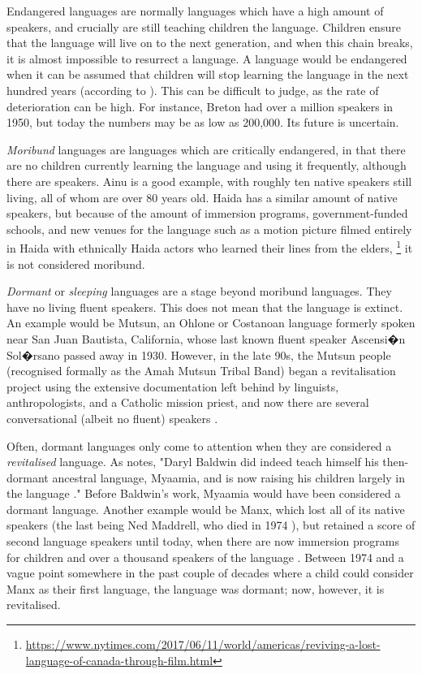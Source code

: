 Endangered languages are normally languages which have a high amount of speakers, and crucially are still teaching children the language. Children ensure that the language will live on to the next generation, and when this chain breaks, it is almost impossible to resurrect a language. A language would be endangered when it can be assumed that children will stop learning the language in the next hundred years (according to \citet{krauss92}). This can be difficult to judge, as the rate of deterioration can be high. For instance, Breton had over a million speakers in 1950, but today the numbers may be as low as 200,000. Its future is uncertain.

 \emph{Moribund} languages are languages which are critically endangered, in that there are no children currently learning the language and using it frequently, although there are speakers. Ainu is a good example, with roughly ten native speakers still living, all of whom are over 80 years old. %
Haida has a similar amount of native speakers, but because of the amount of immersion programs, government-funded schools, and new venues for the language such as a motion picture filmed entirely in Haida with ethnically Haida actors who learned their lines from the elders, \footnote{\href{https://www.nytimes.com/2017/06/11/world/americas/reviving-a-lost-language-of-canada-through-film.html}{https://www.nytimes.com/2017/06/11/world/americas/reviving-a-lost-language-of-canada-through-film.html}} it is not considered moribund.

 \emph{Dormant} or {\it sleeping} languages are a stage beyond moribund languages. They have no living fluent speakers. This does not mean that the language is extinct. An example would be Mutsun, an Ohlone or Costanoan language formerly spoken near San Juan Bautista, California, whose last known fluent speaker Ascensi�n Sol�rsano passed away in 1930. However, in the late 90s, the Mutsun people (recognised formally as the Amah Mutsun Tribal Band)  began a revitalisation project using the extensive documentation left behind by linguists, anthropologists, and a Catholic mission priest, and now there are several conversational (albeit no fluent) speakers \citep{warner2007ethics}.

Often, dormant languages only come to attention when they are considered a {\it revitalised} language. As \citet{warner2007ethics} notes, "Daryl Baldwin did indeed teach himself his then-dormant ancestral language, Myaamia, and is now raising his children largely in the language \citep{hinton2001sleeping, leonard2004acquisition}." Before Baldwin's work, Myaamia would have been considered a dormant language. Another example would be Manx, which lost all of its native speakers (the last being Ned Maddrell, who died in 1974 \citep{wilson2008revitalization}), but retained a score of second language speakers until today, when there are now immersion programs for children and over a thousand speakers of the language \citep{clague2009manx}. Between 1974 and a vague point somewhere in the past couple of decades where a child could consider Manx as their first language, the language was dormant; now, however, it is revitalised.

